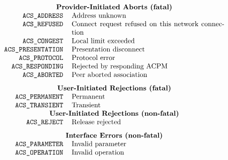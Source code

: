 
\normalsize
\[\begin{tabular}{rp{3.0in}}
    \multicolumn{2}{c}{\bf Provider-Initiated Aborts (fatal)}\\
\tt ACS\_ADDRESS&	Address unknown\\
\tt ACS\_REFUSED&	Connect request refused on this network connection\\
\tt ACS\_CONGEST&	Local limit exceeded\\
\tt ACS\_PRESENTATION&	Presentation disconnect\\
\tt ACS\_PROTOCOL&	Protocol error\\
\tt ACS\_RESPONDING&	Rejected by responding ACPM\\
\tt ACS\_ABORTED&	Peer aborted association\\[0.1in]
    \multicolumn{2}{c}{\bf User-Initiated Rejections (fatal)}\\
\tt ACS\_PERMANENT&	Permanent\\
\tt ACS\_TRANSIENT&	Transient\\
    \multicolumn{2}{c}{\bf User-Initiated Rejections (non-fatal)}\\
\tt ACS\_REJECT&	Release rejected\\[0.1in]
    \multicolumn{2}{c}{\bf Interface Errors (non-fatal)}\\
\tt ACS\_PARAMETER&	Invalid parameter\\
\tt ACS\_OPERATION&	Invalid operation\\
\end{tabular}\]
